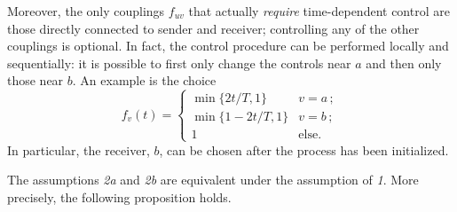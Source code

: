 Moreover, the only couplings $f_{uv}$ that actually \emph{require} time-dependent control are those directly connected to sender and receiver; controlling any of the other couplings is optional. In fact, the control procedure can be performed locally and sequentially: it is possible to first only change the controls near $a$ and then only those near $b$. An example is the choice
\begin{equation*}
    f_v(t) = 
    \begin{cases}
        \min \{ 2t/T,1\} & v =a\,;\\
        \min \{1-2t/T,1\} & v=b\,;\\
        1 &\text{else}.
    \end{cases}
\end{equation*}
In particular, the receiver, $b$, can be chosen after the process has been initialized. 


%
%
%

The assumptions \emph{2a} and \emph{2b} are equivalent under the assumption of \emph{1}. More precisely, the following proposition holds.

